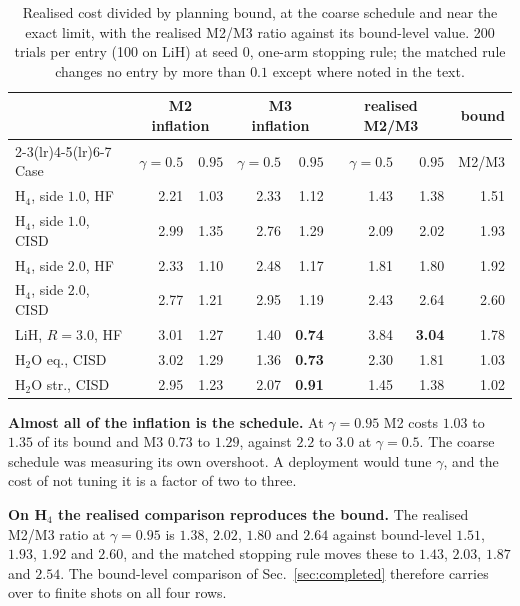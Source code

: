 \documentclass[10pt]{article}
\begin{document}
\begin{table}[!htbp]
\centering
\scriptsize
\caption{Realised cost divided by planning bound, at the coarse schedule and near the exact limit, with the realised M2/M3 ratio against its bound-level value. 200 trials per entry (100 on LiH) at seed $0$, one-arm stopping rule; the matched rule changes no entry by more than $0.1$ except where noted in the text.}
\label{tab:gamma}
\begin{tabular}{lrrrrrrr}
\toprule
 & \multicolumn{2}{c}{M2 inflation} & \multicolumn{2}{c}{M3 inflation} & \multicolumn{2}{c}{realised M2/M3} & bound \\
\cmidrule(lr){2-3}\cmidrule(lr){4-5}\cmidrule(lr){6-7}
Case & $\gamma{=}0.5$ & $0.95$ & $\gamma{=}0.5$ & $0.95$ & $\gamma{=}0.5$ & $0.95$ & M2/M3 \\
\midrule
H$_4$, side $1.0$, HF   & 2.21 & 1.03 & 2.33 & 1.12 & 1.43 & 1.38 & 1.51 \\
H$_4$, side $1.0$, CISD & 2.99 & 1.35 & 2.76 & 1.29 & 2.09 & 2.02 & 1.93 \\
H$_4$, side $2.0$, HF   & 2.33 & 1.10 & 2.48 & 1.17 & 1.81 & 1.80 & 1.92 \\
H$_4$, side $2.0$, CISD & 2.77 & 1.21 & 2.95 & 1.19 & 2.43 & 2.64 & 2.60 \\
LiH, $R{=}3.0$, HF      & 3.01 & 1.27 & 1.40 & \textbf{0.74} & 3.84 & \textbf{3.04} & 1.78 \\
H$_2$O eq., CISD        & 3.02 & 1.29 & 1.36 & \textbf{0.73} & 2.30 & 1.81 & 1.03 \\
H$_2$O str., CISD       & 2.95 & 1.23 & 2.07 & \textbf{0.91} & 1.45 & 1.38 & 1.02 \\
\bottomrule
\end{tabular}
\end{table}

\textbf{Almost all of the inflation is the schedule.} At $\gamma=0.95$ M2 costs
$1.03$ to $1.35$ of its bound and M3 $0.73$ to $1.29$, against $2.2$ to $3.0$ at
$\gamma=0.5$. The coarse schedule was measuring its own overshoot. A deployment
would tune $\gamma$, and the cost of not tuning it is a factor of two to three.

\textbf{On H$_4$ the realised comparison reproduces the bound.} The realised
M2/M3 ratio at $\gamma=0.95$ is $1.38$, $2.02$, $1.80$ and $2.64$ against
bound-level $1.51$, $1.93$, $1.92$ and $2.60$, and the matched stopping rule moves
these to $1.43$, $2.03$, $1.87$ and $2.54$. The bound-level comparison of
Sec.~\ref{sec:completed} therefore carries over to finite shots on all four rows.
\end{document}
